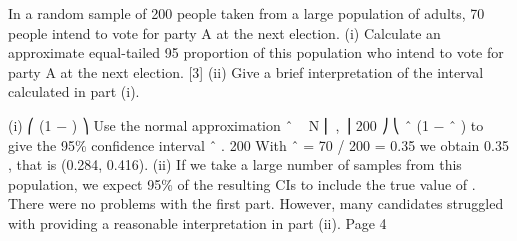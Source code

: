 \documentclass[a4paper,12pt]{article}
\begin{document}
In a random sample of 200 people taken from a large population of adults, 70 people
intend to vote for party A at the next election.
(i) Calculate an approximate equal-tailed 95%
proportion of this population who intend to vote for party A at the next
election.
[3]
(ii) Give a brief interpretation of the interval calculated in part (i).



(i)
⎛ \theta (1 − \theta ) ⎞
Use the normal approximation \theta ˆ ~ N ⎜ \theta ,
⎟
200 ⎠
⎝
\theta ˆ (1 − \theta ˆ )
to give the 95\% confidence interval \theta ˆ 
.
200
With \theta ˆ = 70 / 200 = 0.35 we obtain 0.35  , that is (0.284, 0.416).
(ii)
If we take a large number of samples from this population, we expect 95\% of
the resulting CIs to include the true value of \theta.
There were no problems with the first part. However, many candidates struggled with
providing a reasonable interpretation in part (ii).
Page 4%
\end{document}
